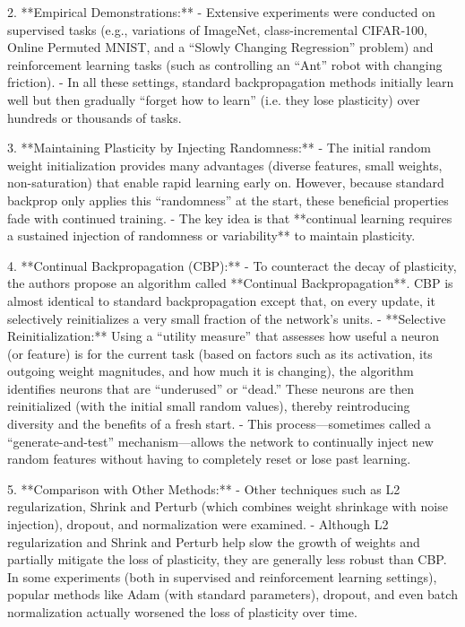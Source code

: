 2. **Empirical Demonstrations:**
   - Extensive experiments were conducted on supervised tasks (e.g., variations of ImageNet, class-incremental CIFAR‑100, Online Permuted MNIST, and a “Slowly Changing Regression” problem) and reinforcement learning tasks (such as controlling an “Ant” robot with changing friction).
   - In all these settings, standard backpropagation methods initially learn well but then gradually “forget how to learn” (i.e. they lose plasticity) over hundreds or thousands of tasks.

3. **Maintaining Plasticity by Injecting Randomness:**
   - The initial random weight initialization provides many advantages (diverse features, small weights, non-saturation) that enable rapid learning early on. However, because standard backprop only applies this “randomness” at the start, these beneficial properties fade with continued training.
   - The key idea is that **continual learning requires a sustained injection of randomness or variability** to maintain plasticity.

4. **Continual Backpropagation (CBP):**
   - To counteract the decay of plasticity, the authors propose an algorithm called **Continual Backpropagation**. CBP is almost identical to standard backpropagation except that, on every update, it selectively reinitializes a very small fraction of the network’s units.
   - **Selective Reinitialization:** Using a “utility measure” that assesses how useful a neuron (or feature) is for the current task (based on factors such as its activation, its outgoing weight magnitudes, and how much it is changing), the algorithm identifies neurons that are “underused” or “dead.” These neurons are then reinitialized (with the initial small random values), thereby reintroducing diversity and the benefits of a fresh start.
   - This process—sometimes called a “generate-and-test” mechanism—allows the network to continually inject new random features without having to completely reset or lose past learning.

5. **Comparison with Other Methods:**
   - Other techniques such as L2 regularization, Shrink and Perturb (which combines weight shrinkage with noise injection), dropout, and normalization were examined.
   - Although L2 regularization and Shrink and Perturb help slow the growth of weights and partially mitigate the loss of plasticity, they are generally less robust than CBP. In some experiments (both in supervised and reinforcement learning settings), popular methods like Adam (with standard parameters), dropout, and even batch normalization actually worsened the loss of plasticity over time.

